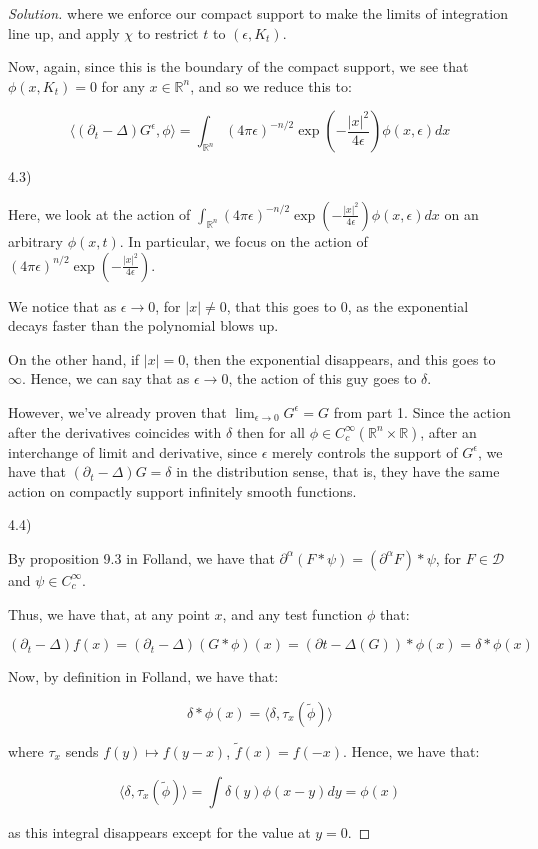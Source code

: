 \documentclass[10pt]{article}
\begin{document}
\begin{proof}[Solution]
where we enforce our compact support to make the limits of integration line up, and apply $\chi$ to restrict $t$ to $(\epsilon, K_t)$.

Now, again, since this is the boundary of the compact support, we see that $\phi(x, K_t) = 0$ for any $x \in \mathbb{R}^n$, and so we reduce this to:

$$ \langle ( \partial_t - \Delta) G^\epsilon, \phi \rangle = \int_{\mathbb{R}^n} (4 \pi \epsilon)^{-n/2} \exp\left(-\frac{| x|^2}{4\epsilon}\right)\phi(x, \epsilon) dx $$ 


4.3)

Here, we look at the action of $\int_{\mathbb{R}^n} (4 \pi \epsilon)^{-n/2} \exp\left(-\frac{| x|^2}{4\epsilon}\right)\phi(x, \epsilon) dx$ on an arbitrary $\phi(x, t)$. In particular, we focus on the action of $ (4 \pi \epsilon)^{n/2} \exp\left(-\frac{| x|^2}{4\epsilon}\right)$.

We notice that as $\epsilon \to 0$, for $|x| \not = 0$, that this goes to $0$, as the exponential decays faster than the polynomial blows up.

On the other hand, if $|x| = 0$, then the exponential disappears, and this goes to $\infty$. Hence, we can say that as $\epsilon \to 0$, the action of this guy goes to $\delta$.

However, we've already proven that $\lim_{\epsilon \to 0} G^\epsilon = G$ from part 1. Since the action after the derivatives coincides with $\delta$ then for all $\phi \in C^\infty_c(\mathbb{R}^n \times \mathbb{R})$, after an interchange of limit and derivative, since $\epsilon$ merely controls the support of $G^\epsilon$, we have that $(\partial_t - \Delta) G = \delta$ in the distribution sense, that is, they have the same action on compactly support infinitely smooth functions.

4.4)

By proposition 9.3 in Folland, we have that $\partial^\alpha(F \ast \psi) = (\partial^\alpha F) \ast \psi$, for $F \in \mathcal{D}$ and $\psi \in C^\infty_c$.

Thus, we have that, at any point $x$, and any test function $\phi$ that:

$$ ( \partial_t - \Delta)f(x) = (\partial_t - \Delta)(G \ast \phi)(x) = (\partial t - \Delta (G)) \ast \phi(x) = \delta \ast \phi(x)$$

Now, by definition in Folland, we have that:

$$ \delta \ast \phi(x) = \langle \delta, \tau_x(\tilde{\phi}) \rangle$$

where $\tau_x$ sends $f(y) \mapsto f(y - x)$, $\tilde{f}(x) = f(-x)$. Hence, we have that:

$$ \langle \delta, \tau_x(\tilde{\phi}) \rangle = \int \delta(y) \phi(x - y) dy = \phi(x) $$

as this integral disappears except for the value at $y = 0$.

\end{proof}
\end{document}

